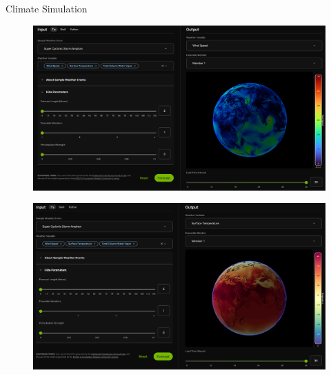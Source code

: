 \begin{frame}[allowframebreaks]{Climate Simulation}
    \framebreak

    \begin{figure}
        \centering
        \href{https://build.nvidia.com/nvidia/fourcastnet?snippet_tab=Try}{\includegraphics[height=0.9\textheight,width=1\textwidth,keepaspectratio]{images/science/climate-sim-nvidia-1.png}}
    \end{figure}

    \framebreak

    \begin{figure}
        \centering
        \href{https://build.nvidia.com/nvidia/fourcastnet?snippet_tab=Try}{\includegraphics[height=0.9\textheight,width=1\textwidth,keepaspectratio]{images/science/climate-sim-nvidia-2.png}}
    \end{figure}

    \framebreak


\end{frame}
